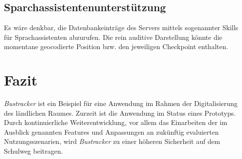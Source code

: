 \subsection{Sparchassistentenunterstützung}
Es wäre denkbar, die Datenbankeinträge des Servers mittels sogenannter Skills für Sprachassistenten abzurufen. Die rein auditive Darstellung könnte die momentane geocodierte Position bzw. den jeweiligen Checkpoint enthalten. 

\section{Fazit}
\label{Fazit}

\emph{Bustracker} ist ein Beispiel für eine Anwendung im Rahmen der Digitalisierung des ländlichen Raumes. Zurzeit ist die Anwendung im Status eines Prototyps. Durch kontinuierliche Weiterentwicklung, vor allem das Einarbeiten der im Ausblick genannten Features und Anpassungen an zukünftig evaluierten Nutzungsszenarien, wird \emph{Bustracker} zu einer höheren Sicherheit auf dem Schulweg beitragen.
